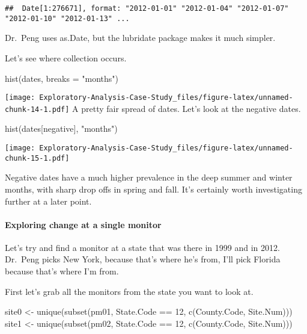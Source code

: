 \documentclass[
]{article}
\newenvironment{Shaded}{\begin{snugshade}}{\end{snugshade}}
\newcommand{\AttributeTok}[1]{\textcolor[rgb]{0.77,0.63,0.00}{#1}}
\newcommand{\DecValTok}[1]{\textcolor[rgb]{0.00,0.00,0.81}{#1}}
\newcommand{\FunctionTok}[1]{\textcolor[rgb]{0.00,0.00,0.00}{#1}}
\newcommand{\NormalTok}[1]{#1}
\newcommand{\OtherTok}[1]{\textcolor[rgb]{0.56,0.35,0.01}{#1}}
\newcommand{\SpecialCharTok}[1]{\textcolor[rgb]{0.00,0.00,0.00}{#1}}
\newcommand{\StringTok}[1]{\textcolor[rgb]{0.31,0.60,0.02}{#1}}
\begin{document}
\begin{verbatim}
##  Date[1:276671], format: "2012-01-01" "2012-01-04" "2012-01-07" "2012-01-10" "2012-01-13" ...
\end{verbatim}

Dr.~Peng uses as.Date, but the lubridate package makes it much simpler.

Let's see where collection occurs.

\begin{Shaded}
\begin{Highlighting}[]
\FunctionTok{hist}\NormalTok{(dates, }\AttributeTok{breaks =} \StringTok{"months"}\NormalTok{)}
\end{Highlighting}
\end{Shaded}

\texttt{[image: Exploratory-Analysis-Case-Study\_files/figure-latex/unnamed-chunk-14-1.pdf]}
A pretty fair spread of dates. Let's look at the negative dates.

\begin{Shaded}
\begin{Highlighting}[]
\FunctionTok{hist}\NormalTok{(dates[negative], }\StringTok{"months"}\NormalTok{)}
\end{Highlighting}
\end{Shaded}

\texttt{[image: Exploratory-Analysis-Case-Study\_files/figure-latex/unnamed-chunk-15-1.pdf]}

Negative dates have a much higher prevalence in the deep summer and
winter months, with sharp drop offs in spring and fall. It's certainly
worth investigating further at a later point.

\hypertarget{exploring-change-at-a-single-monitor}{%
\paragraph{Exploring change at a single
monitor}\label{exploring-change-at-a-single-monitor}}

Let's try and find a monitor at a state that was there in 1999 and in
2012. Dr.~Peng picks New York, because that's where he's from, I'll pick
Florida because that's where I'm from.

First let's grab all the monitors from the state you want to look at.

\begin{Shaded}
\begin{Highlighting}[]
\NormalTok{site0 }\OtherTok{\textless{}{-}} \FunctionTok{unique}\NormalTok{(}\FunctionTok{subset}\NormalTok{(pm01, State.Code }\SpecialCharTok{==} \DecValTok{12}\NormalTok{, }\FunctionTok{c}\NormalTok{(County.Code, Site.Num)))}
\NormalTok{site1 }\OtherTok{\textless{}{-}} \FunctionTok{unique}\NormalTok{(}\FunctionTok{subset}\NormalTok{(pm02, State.Code }\SpecialCharTok{==} \DecValTok{12}\NormalTok{, }\FunctionTok{c}\NormalTok{(County.Code, Site.Num)))}
\end{Highlighting}
\end{Shaded}
\end{document}
